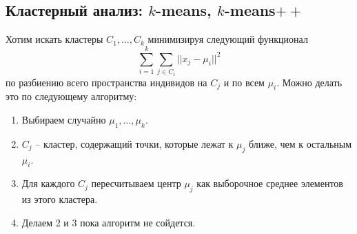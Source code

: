 \subsection{Кластерный	анализ: $k$-means,	$k$-means$++$}
Хотим искать кластеры $C_1, \ldots, C_k$ минимизируя следующий функционал
\begin{equation}
\sum\limits_{i = 1}^k \sum\limits_{j \in C_i} ||x_j - \mu_i||^2
\label{func_lin}
\end{equation}
по разбиению всего пространства индивидов на $C_j$ и по всем $\mu_i$.
Можно делать это по следующему алгоритму:
\begin{enumerate}
\item Выбираем случайно $\mu_1, \ldots, \mu_k$.
\item $C_j$ -- кластер, содержащий точки, которые лежат к $\mu_j$ ближе, чем к остальным $\mu_i$.
\item Для каждого $C_j$ пересчитываем центр $\mu_j$ как выборочное среднее элементов из этого кластера.
\item Делаем 2 и 3 пока алгоритм не сойдется.
\end{enumerate}



